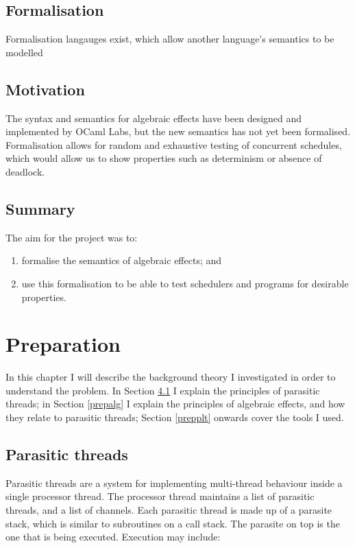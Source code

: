 \documentclass[12pt,a4paper,twoside,openright]{report}
\begin{document}
\section{Formalisation}

Formalisation langauges exist, which allow another language's semantics to be modelled

\section{Motivation}

The syntax and semantics for algebraic effects have been designed and implemented by OCaml Labs, but the new semantics has not yet been formalised. Formalisation allows for random and exhaustive testing of concurrent schedules, which would allow us to show properties such as determinism or absence of deadlock.

\section{Summary}

The aim for the project was to:

\begin{enumerate}[label=(\alph*)]
\item formalise the semantics of algebraic effects; and
\item use this formalisation to be able to test schedulers and programs for desirable properties.
\end{enumerate}

\chapter{Preparation}

In this chapter I will describe the background theory I investigated in order to understand the problem. In Section \ref{preppara} I explain the principles of parasitic threads; in Section \ref{prepalg} I explain the principles of algebraic effects, and how they relate to parasitic threads; Section \ref{prepplt} onwards cover the tools I used.

\section{Parasitic threads}\label{preppara}
Parasitic threads are a system for implementing multi-thread behaviour inside a single processor thread. The processor thread maintains a list of parasitic threads, and a list of channels. Each parasitic thread is made up of a parasite stack, which is similar to subroutines on a call stack. The parasite on top is the one that is being executed. Execution may include: 
\end{document}
